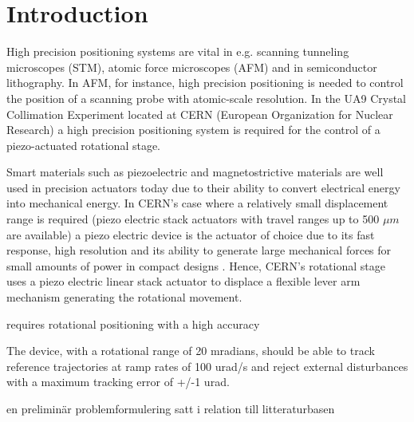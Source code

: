 \chapter{Introduction}\label{cha:intro}

High precision positioning systems are vital in e.g. scanning tunneling microscopes (STM), atomic force microscopes (AFM) and in semiconductor lithography. In AFM, for instance, high precision positioning is needed to control the position of a scanning probe with atomic-scale resolution. In the UA9 Crystal Collimation Experiment located at CERN (European Organization for Nuclear Research) a high precision positioning system is required for the control of a piezo-actuated rotational stage.

Smart materials such as piezoelectric and magnetostrictive materials are well used in precision actuators today due to their ability to convert electrical energy into mechanical energy. %
In CERN's case where a relatively small displacement range is required (piezo electric stack actuators with travel ranges up to 500 $\mu m$ are available) a piezo electric device is the actuator of choice due to its fast response, high resolution and its ability to generate large mechanical forces for small amounts of power in compact designs \citep{SurveyOfControlIssues:2007}. Hence, CERN's rotational stage uses a piezo electric linear stack actuator to displace a flexible lever arm mechanism generating the rotational movement.

requires rotational positioning with a high accuracy

The device, with a rotational range of 20 mradians, should be able to track reference trajectories at ramp rates of 100 urad/s and reject external disturbances with a maximum tracking error of +/-1 urad.



en preliminär problemformulering satt i relation till litteraturbasen
